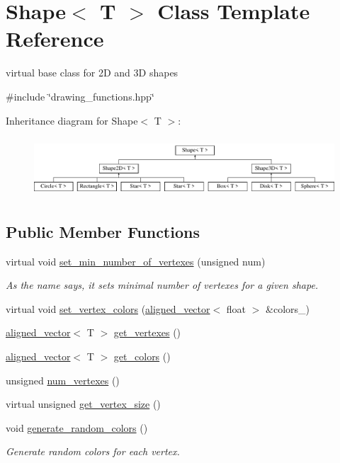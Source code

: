 \hypertarget{classShape}{}\section{Shape$<$ T $>$ Class Template Reference}
\label{classShape}


virtual base class for 2D and 3D shapes  




{\ttfamily \#include \char`\"{}drawing\+\_\+functions.\+hpp\char`\"{}}

Inheritance diagram for Shape$<$ T $>$\+:\begin{figure}[H]
\begin{center}
\leavevmode
\includegraphics[height=2.242991cm]{classShape}
\end{center}
\end{figure}
\subsection*{Public Member Functions}
\begin{DoxyCompactItemize}
\item 
virtual void \mbox{\hyperlink{classShape_ac5a35fe1b2ecb8fcfc050a31c8969805}{set\+\_\+min\+\_\+number\+\_\+of\+\_\+vertexes}} (unsigned num)
\begin{DoxyCompactList}\small\item\em As the name says, it sets minimal number of vertexes for a given shape. \end{DoxyCompactList}\item 
virtual void \mbox{\hyperlink{classShape_a69dabd50440dba1ac463ad6819cdb506}{set\+\_\+vertex\+\_\+colors}} (\mbox{\hyperlink{type__definitions_8hpp_accb98a876f193a416d9c8a02fe22d526}{aligned\+\_\+vector}}$<$ float $>$ \&colors\+\_\+)
\item 
\mbox{\hyperlink{type__definitions_8hpp_accb98a876f193a416d9c8a02fe22d526}{aligned\+\_\+vector}}$<$ T $>$ \mbox{\hyperlink{classShape_a3729bbdd0c4e4f3379498734807bb545}{get\+\_\+vertexes}} ()
\item 
\mbox{\hyperlink{type__definitions_8hpp_accb98a876f193a416d9c8a02fe22d526}{aligned\+\_\+vector}}$<$ T $>$ \mbox{\hyperlink{classShape_aabe9bd208b0ece9824cb45deccc11ba7}{get\+\_\+colors}} ()
\item 
unsigned \mbox{\hyperlink{classShape_a131e85c7f5cad85bffb92e6719117cab}{num\+\_\+vertexes}} ()
\item 
virtual unsigned \mbox{\hyperlink{classShape_a58713d8cf7c4175e7c76eae75c94bc13}{get\+\_\+vertex\+\_\+size}} ()
\item 
void \mbox{\hyperlink{classShape_aabeb601fe95b412987d5b5c276bf8a7a}{generate\+\_\+random\+\_\+colors}} ()
\begin{DoxyCompactList}\small\item\em Generate random colors for each vertex. \end{DoxyCompactList}\end{DoxyCompactItemize}
